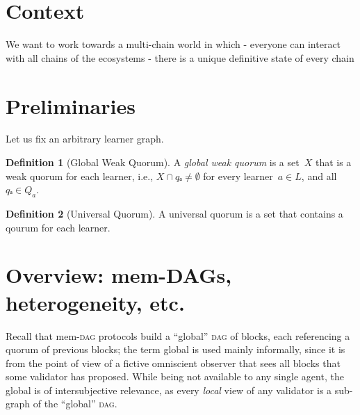 \documentclass[dvipsnames]{article}
\theoremstyle{definition}
\newtheorem{definition}{Definition}
\newcommand{\Dag}[1][]{\textsc{dag}#1\xspace}
\newcommand{\Learner}{%
  \ensuremath{L}
}
\newcommand{\Q}[1]{%
  Q_{#1}%
}
\begin{document}

\section{Context}
\label{sec:context}

We want to work towards a multi-chain world in
which
- everyone can interact with all chains of the ecosystems
- there is a unique definitive state of every chain





\section{Preliminaries}
\label{sec:preliminaries}

Let us fix an arbitrary learner graph.

\begin{definition}[Global Weak Quorum]
  \label{def:global-weak-quorum}
  A %
  \emph{global weak quorum} %
  is a set~\(X\) that is a weak quorum for each learner,  %
  i.e., \(X ∩ qₐ ≠ ∅\) %
  for every learner~\(a ∈ \Learner\), and %
  all \(qₐ ∈ \Q{a}\).
\end{definition}

\begin{definition}[Universal Quorum]
  \label{def:universal-quorum}
  A universal quorum is a set
  that contains a qourum for each learner.
\end{definition}

\section{Overview: %
  mem-DAGs, heterogeneity, etc.
}
\label{sec:overview}
Recall that mem-\Dag protocols build a “global” \Dag of blocks,
each referencing a quorum of previous blocks;
the term global is used mainly informally,
since it is from the point of view of a
fictive omniscient observer
that sees all blocks that some validator has proposed.
While being not available to any single agent,
the global \dag is of intersubjective relevance,
as every \emph{local} view of any validator
is a sub-graph of the “global” \Dag.
\end{document}

